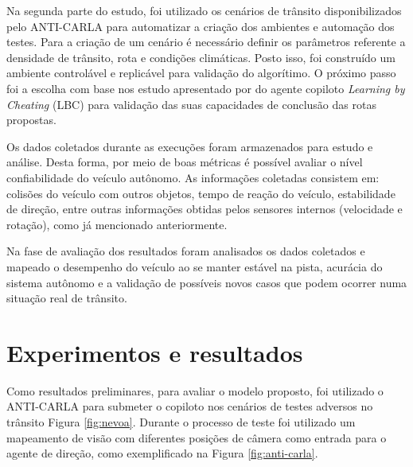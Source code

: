 \documentclass[a4paper,12pt,Times]{article}
\begin{document}
Na segunda parte do estudo, foi utilizado os cenários de trânsito disponibilizados pelo ANTI-CARLA para automatizar a criação dos ambientes e automação dos testes. Para a criação de um cenário é necessário definir os parâmetros referente a densidade de trânsito, rota e condições climáticas. Posto isso, foi construído um ambiente controlável e replicável para validação do algorítimo. O próximo passo foi a escolha com base nos estudo apresentado por  do agente copiloto \textit{Learning by Cheating} (LBC) para validação das suas capacidades de conclusão das rotas propostas.


Os dados coletados durante as execuções foram armazenados para estudo e análise. Desta forma, por meio de boas métricas é possível avaliar o nível confiabilidade do veículo autônomo. As informações coletadas consistem em: colisões do veículo com outros objetos, tempo de reação do veículo, estabilidade de direção, entre outras informações obtidas pelos sensores internos (velocidade e rotação), como já mencionado anteriormente.


Na fase de avaliação dos resultados foram analisados os dados coletados e mapeado o  desempenho do veículo ao se manter estável na pista, acurácia do sistema autônomo e a validação de possíveis novos casos que podem ocorrer numa situação real de trânsito.

\section{Experimentos e resultados}
Como resultados preliminares, para avaliar o modelo proposto, foi utilizado o ANTI-CARLA para submeter o copiloto nos cenários de testes adversos no trânsito Figura \ref{fig:nevoa}. Durante o processo de teste foi utilizado um mapeamento de visão com diferentes posições de câmera como entrada para o agente de direção, como exemplificado na Figura \ref{fig:anti-carla}.
\end{document}
